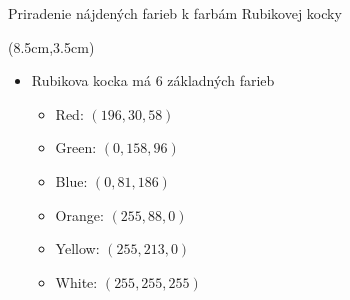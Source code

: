 \documentclass[red]{beamer}
\begin{document}
\begin{frame}{Priradenie nájdených farieb k farbám Rubikovej kocky}
\begin{textblock*}{3cm}(8.5cm,3.5cm)
\end{textblock*}
\begin{itemize}
\item<2->{Rubikova kocka má 6 základných farieb}
    \begin{itemize}
    \item<2-> Red: $(196, 30, 58)$
    \item<2-> Green: $(0, 158, 96)$
    \item<2-> Blue: $(0, 81, 186)$
    \item<2-> Orange: $(255, 88, 0)$
    \item<2-> Yellow: $(255, 213, 0)$
    \item<2-> White: $(255, 255, 255)$
    \end{itemize}
\end{itemize}
\end{frame}
\end{document}
